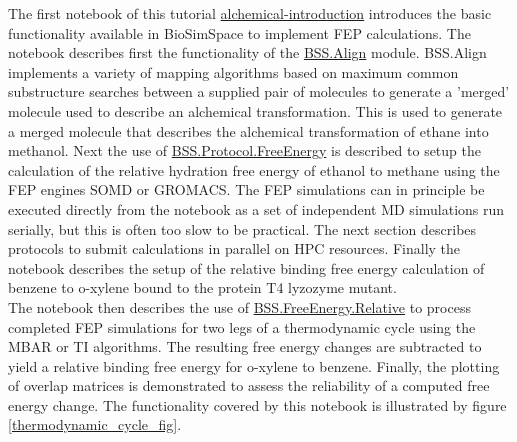 The first notebook of this tutorial \href{https://github.com/OpenBioSim/BioSimSpaceTutorials/blob/main/04_fep/01_intro_to_alchemy/alchemical_introduction.ipynb}{alchemical-introduction} introduces the basic functionality available in BioSimSpace to implement FEP calculations. 
The notebook describes first the functionality of the \href{https://biosimspace.openbiosim.org/api/index_Align.html}{BSS.Align} module. BSS.Align implements a variety of mapping algorithms based on maximum common substructure searches between a supplied pair of molecules to generate a 'merged' molecule used to describe an alchemical transformation. This is used to generate a merged molecule that describes the alchemical transformation of ethane into methanol.
Next the use of \href{https://biosimspace.openbiosim.org/api/generated/BioSimSpace.Protocol.FreeEnergy.html#BioSimSpace.Protocol.FreeEnergy}{BSS.Protocol.FreeEnergy} is described to setup the calculation of the relative hydration free energy of ethanol to methane using the FEP engines SOMD or GROMACS. 
The FEP simulations can in principle be executed directly from the notebook as a set of independent MD simulations run serially, but this is often too slow to be practical. The next section describes protocols to submit calculations in parallel on HPC resources.
Finally the notebook describes the setup of the relative binding free energy calculation of benzene to o-xylene bound to the protein T4 lyzozyme mutant. 
\\
The notebook then describes the use of \href{https://biosimspace.openbiosim.org/api/generated/BioSimSpace.FreeEnergy.Relative.html#}{BSS.FreeEnergy.Relative} to process completed FEP simulations for two legs of a thermodynamic cycle using the MBAR or TI algorithms. The resulting free energy changes are subtracted to yield a relative binding free energy for o-xylene to benzene. Finally, the plotting of overlap matrices is demonstrated to assess the reliability of a computed free energy change. The functionality covered by this notebook is illustrated by figure \ref{thermodynamic_cycle_fig}.

